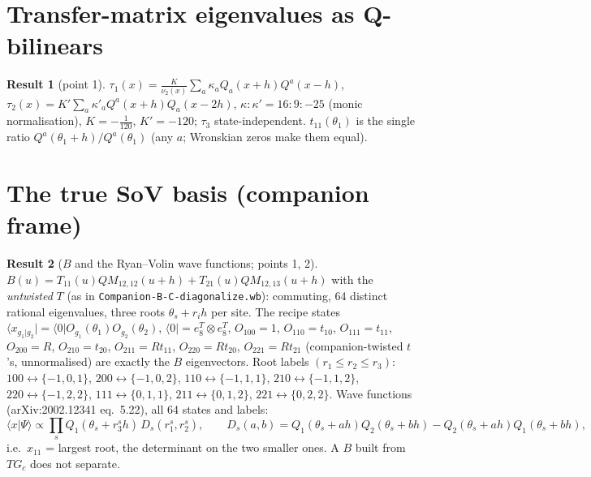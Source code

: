 \documentclass[11pt]{article}
\newcommand{\nb}[1]{\texttt{#1}}
\newcommand{\vac}{\langle 0|}
\theoremstyle{definition}
\newtheorem{result}{Result}
\theoremstyle{remark}
\begin{document}
\section{Transfer-matrix eigenvalues as Q-bilinears}

\begin{result}[point 1]
$\tau_1(x)=\frac{K}{\nu_2(x)}\sum_a\kappa_aQ_a(x+h)Q^a(x-h)$, $\tau_2(x)=K'\sum_a\kappa'_aQ^a(x+h)Q_a(x-2h)$, $\kappa:\kappa'=16:9:-25$ (monic normalisation), $K=-\tfrac1{120}$, $K'=-120$; $\tau_3$ state-independent. $t_{11}(\theta_1)$ is the single ratio $Q^a(\theta_1+h)/Q^a(\theta_1)$ (any $a$; Wronskian zeros make them equal).
\end{result}

\section{The true SoV basis (companion frame)}

\begin{result}[$B$ and the Ryan--Volin wave functions; points 1, 2]
$B(u)=T_{11}(u)QM_{12,12}(u+h)+T_{21}(u)QM_{12,13}(u+h)$ with the \emph{untwisted} $T$ (as in \nb{Companion-B-C-diagonalize.wb}): commuting, 64 distinct rational eigenvalues, three roots $\theta_s+r_ih$ per site. The recipe states $\langle x_{g_1|g_2}|=\vac O_{g_1}(\theta_1)O_{g_2}(\theta_2)$, $\vac=e_8^T\otimes e_8^T$, $O_{100}=1$, $O_{110}=t_{10}$, $O_{111}=t_{11}$, $O_{200}=R$, $O_{210}=t_{20}$, $O_{211}=Rt_{11}$, $O_{220}=Rt_{20}$, $O_{221}=Rt_{21}$ (companion-twisted $t$'s, unnormalised) are exactly the $B$ eigenvectors. Root labels $(r_1\le r_2\le r_3)$: $100\leftrightarrow\{-1,0,1\}$, $200\leftrightarrow\{-1,0,2\}$, $110\leftrightarrow\{-1,1,1\}$, $210\leftrightarrow\{-1,1,2\}$, $220\leftrightarrow\{-1,2,2\}$, $111\leftrightarrow\{0,1,1\}$, $211\leftrightarrow\{0,1,2\}$, $221\leftrightarrow\{0,2,2\}$.
Wave functions (arXiv:2002.12341 eq.~5.22), all 64 states and labels:
\[
\langle x|\Psi\rangle\propto\prod_{s}Q_1(\theta_s+r^s_3h)\,D_s(r^s_1,r^s_2),\qquad D_s(a,b)=Q_1(\theta_s+ah)Q_2(\theta_s+bh)-Q_2(\theta_s+ah)Q_1(\theta_s+bh),
\]
i.e.\ $x_{11}$ = largest root, the determinant on the two smaller ones. A $B$ built from $TG_c$ does not separate.
\end{result}
\end{document}

